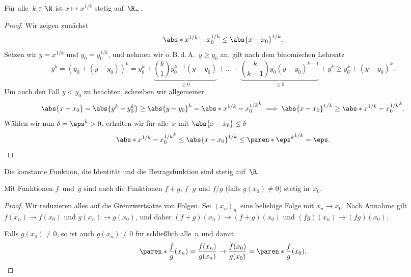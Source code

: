 \documentclass[a4paper]{article}
\begin{document}
\begin{proposition}
    Für alle~$k \in \N$ ist $x \mapsto x^{1/k}$ stetig auf~$\R_+$.
\end{proposition}

\begin{proof}
    Wir zeigen zunächst
    \begin{equation*}
        \abs*{x^{1/k}-x_0^{1/k}} \leq \abs{x-x_0}^{1/k}.
    \end{equation*}
    Setzen wir $y = x^{1/k}$ und $y_0 = y_0^{1/k}$, und nehmen wir o.\,B.\,d.\,A.\ $y \geq y_0$ an, gilt nach dem binomischen Lehrsatz
    \begin{equation*}
        y^k = (y_0 + (y-y_0))^k = y_0^k + \underbrace{\binom{k}{1}y_0^{k-1}(y-y_0)}_{\geq 0} + \dots + \underbrace{\binom{k}{k-1}y_0(y-y_0)^{k-1}}_{\geq 0} + y^k \geq y_0^k + (y-y_0)^k.
    \end{equation*}
    Um auch den Fall $y < y_0$ zu beachten, schreiben wir allgemeiner
    \begin{equation*}
        \abs{x-x_0} = \abs{y^k-y_0^k} \geq \abs{y-y_0}^k = \abs*{x^{1/k}-x_0^{1/k}}^k \implies \abs{x-x_0}^{1/k} \geq \abs*{x^{1/k}-x_0^{1/k}}^k.
    \end{equation*}
    Wählen wir nun $\delta = \eps^k > 0$, erhalten wir für alle~$x$ mit $\abs{x-x_0} \leq \delta$
    \begin{equation*}
        \abs*{x^{1/k}-x_0^{1/k}}^k \leq \abs{x-x_0}^{1/k} \leq \paren*{\eps^k}^{1/k} = \eps. \qedhere
    \end{equation*}
\end{proof}

\begin{proposition}
    Die konstante Funktion, die Identität und die Betragsfunktion sind stetig auf~$\R$.
\end{proposition}

\begin{proposition}
    Mit Funktionen $f$~und~$g$ sind auch die Funktionen $f+g$, $f\cdot g$ und $f/g$ (falls $g(x_0) \neq 0$) stetig in~$x_0$.
\end{proposition}

\begin{proof}
    Wir reduzieren alles auf die Grenzwertsätze von Folgen. Sei $(x_n)_n$~eine beliebige Folge mit $x_n \to x_0$. Nach Annahme gilt $f(x_n) \to f(x_0)$ und $g(x_n) \to g(x_0)$, und daher $(f+g)(x_n) \to (f+g)(x_0)$ und $(fg)(x_n) \to (fg)(x_0)$.

    Falls $g(x_0) \neq 0$, so ist auch $g(x_n) \neq 0$ für schließlich alle~$n$ und damit
    \begin{equation*}
        \paren*{\frac{f}{g}}(x_n) = \frac{f(x_n)}{g(x_n)} \to \frac{f(x_0)}{g(x_0)} = \paren*{\frac{f}{g}}(x_0). \qedhere
    \end{equation*}
\end{proof}
\end{document}
